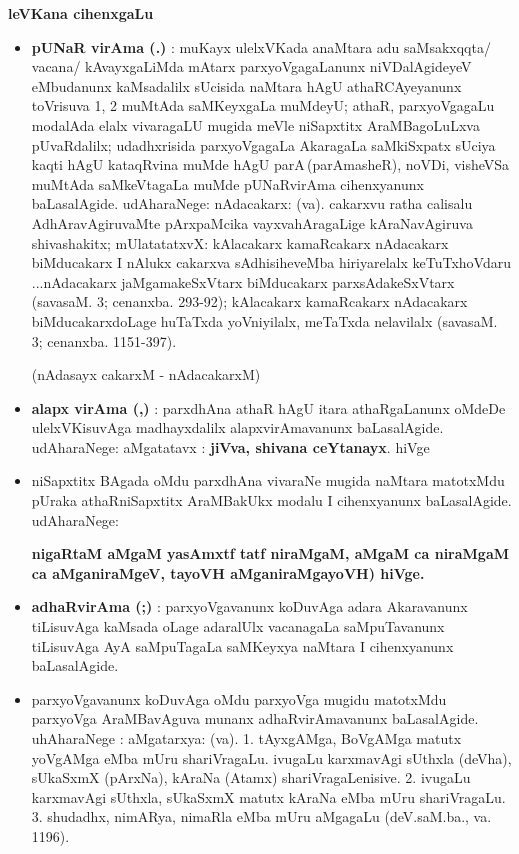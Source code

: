 \begin{center}
{\large\bf leVKana cihenxgaLu}
\bigskip
\end{center}
\begin{itemize}
\item {\bf pUNaR virAma (.)} : muKayx ulelxVKada anaMtara adu saMsakxqqta/ vacana/ kAvayxgaLiMda mAtarx parxyoVgagaLanunx niVDa\-lAgideyeV eMbudanunx kaMsa\-dalilx sUcisida naMtara hAgU athaRCAyeyanunx toVrisuva 1, 2 muMtAda saMKeyxgaLa muMdeyU; athaR, parxyoVga\-gaLu modalAda elalx vivaragaLU mugida meVle niSapxtitx AraMBagoLuLxva pUvaRdalilx; udadhxrisida  parxyoVgagaLa AkaragaLa saMkiSxpatx sUciya kaqti hAgU kataqRvina muMde hAgU parA\,(parAmasheR), noVDi, visheVSa muMtAda saMkeVtagaLa muMde pUNaRvirAma cihenxyanunx baLasalAgide. udAharaNege: nAdacakarx: (va). cakarxvu ratha calisalu AdhAravAgiruvaMte pArxpaMcika vayxvahAragaLige kAraNavAgiruva shivashakitx; mUla\-tatatxvX: kAlacakarx kamaRcakarx nAdacakarx biMducakarx I nAlukx cakarxva sAdhisiheveMba hiriyarelalx keTuTxhoVdaru ...nAdacakarx jaMgama\-keSxVtarx biMducakarx parxsAda\-keSxVtarx (savasaM. 3; cenanxba. 293-92); kAlacakarx kamaRcakarx nAdacakarx biMducakarxdoLage huTaTxda yoVni\-yilalx, meTaTxda nela\-vilalx (savasaM. 3; cenanxba. 1151-397).

\noindent
(nAdasayx cakarxM - nAdacakarxM)

\item {\bf alapx virAma (,)} : parxdhAna athaR hAgU itara athaRgaLanunx oMdeDe ulelxVKisuvAga madhayxdalilx alapxvirAmavanunx baLasalAgide. udAharaNege: aMgatatavx : \textbf{jiVva, shivana ceYtanayx}. hiVge

\item niSapxtitx BAgada oMdu parxdhAna vivaraNe mugida naMtara matotxMdu pUraka athaRniSapxtitx AraMBakUkx modalu I cihenx\-yanunx baLasalAgide. udAharaNege: 

\textbf{nigaRtaM aMgaM yasAmxtf tatf niraMgaM, aMgaM ca niraMgaM ca aMganiraMgeV, tayoVH aMganiraMgayoVH) hiVge.}


\item {\bf adhaRvirAma (;)} : parxyoVgavanunx koDuvAga adara Akaravanunx tiLisuvAga kaMsada oLage adaralUlx vacanagaLa saMpuTavanunx tiLisuvAga AyA saMpuTagaLa saMKeyxya naMtara I cihenxyanunx baLasalAgide.

\item  parxyoVgavanunx koDuvAga oMdu parxyoVga mugidu matotxMdu parxyoVga AraMBavAguva munanx  adhaRvirAmavanunx baLasalAgide. uhAharaNege : aMgatarxya: (va). 1. tAyxgAMga, BoVgAMga matutx yoVgAMga eMba mUru shariVragaLu. ivugaLu karxmavAgi sUthxla (deVha), sUkaSxmX (pArxNa), kAraNa (Atamx) shariVragaLenisive. 2. ivugaLu karxmavAgi sUthxla, sUkaSxmX matutx kAraNa eMba mUru shariVragaLu. 3. shudadhx, nimARya, nimaRla eMba mUru aMgagaLu (deV.saM.ba., va. 1196).


\end{itemize}
